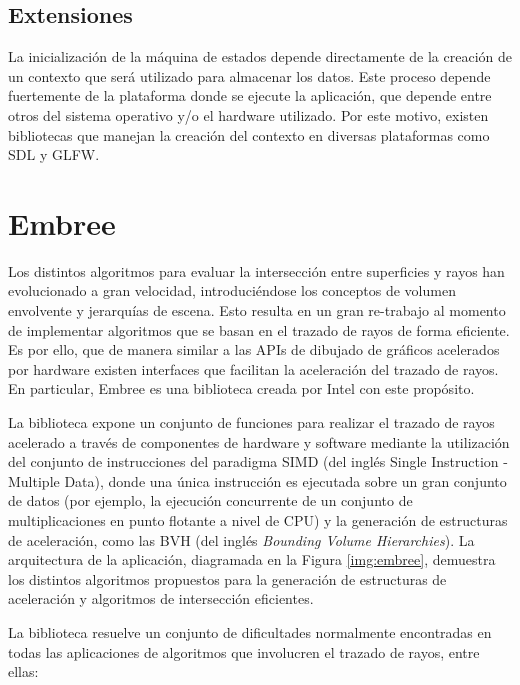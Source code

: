 \subsection{Extensiones}
La inicialización de la máquina de estados depende directamente de la creación de un contexto que será utilizado para almacenar los datos. Este proceso depende fuertemente de la plataforma donde se ejecute la aplicación, que depende entre otros del sistema operativo y/o el hardware utilizado. Por este motivo, existen bibliotecas que manejan la creación del contexto en diversas plataformas como SDL y GLFW.
	
\section{Embree}

Los distintos algoritmos para evaluar la intersección entre superficies y rayos han evolucionado a gran velocidad, introduciéndose los conceptos de volumen envolvente y jerarquías de escena. Esto resulta en un gran re-trabajo al momento de implementar algoritmos que se basan en el trazado de rayos de forma eficiente. Es por ello, que de manera similar a las APIs de dibujado de gráficos acelerados por hardware existen interfaces que facilitan la aceleración del trazado de rayos. En particular, Embree es una biblioteca creada por Intel con este propósito.

La biblioteca expone un conjunto de funciones para realizar el trazado de rayos acelerado a través de componentes de hardware y software mediante la utilización del conjunto de instrucciones del paradigma SIMD (del inglés Single Instruction - Multiple Data), donde una única instrucción es ejecutada sobre un gran conjunto de datos (por ejemplo, la ejecución concurrente de un conjunto de multiplicaciones en punto flotante a nivel de CPU) y la generación de estructuras de aceleración, como las BVH (del inglés \textit{Bounding Volume Hierarchies}). La arquitectura de la aplicación, diagramada en la Figura \ref{img:embree}, demuestra los distintos algoritmos propuestos para la generación de estructuras de aceleración y algoritmos de intersección eficientes.

La biblioteca resuelve un conjunto de dificultades normalmente encontradas en todas las aplicaciones de algoritmos que involucren el trazado de rayos, entre ellas:

